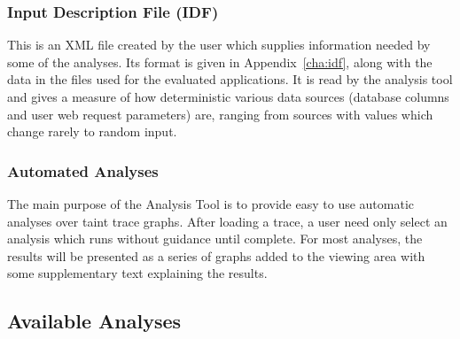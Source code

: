 \documentclass[msc,oneside]{ubcthesis}
\begin{document}




\subsubsection{Input Description File (IDF)}
\label{sec:idf}
This is an XML file created by the user which supplies information needed by some of the analyses. Its format is given in Appendix~\ref{cha:idf}, along with the data in the files used for the evaluated applications. It is read by the analysis tool and gives a measure of how deterministic various data sources (database columns and user web request parameters) are, ranging from sources with values which change rarely to random input.

\subsubsection{Automated Analyses}
The main purpose of the Analysis Tool is to provide easy to use automatic analyses over taint trace graphs. After loading a trace, a user need only select an analysis which runs without guidance until complete. For most analyses, the results will be presented as a series of graphs added to the viewing area with some supplementary text explaining the results.

\subsection{Available Analyses}
\end{document}
